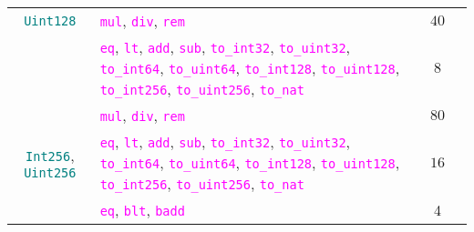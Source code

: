 \documentclass[9pt]{article}
\begin{document}
\begin{table}[!hbt]
\begin{tabular}{|c|p{4.1cm}|c|p{5cm}|}
{		\texttt{\textcolor{teal}{Uint128}}} &
		\texttt{\textcolor{magenta}{mul}},
		 \texttt{\textcolor{magenta}{div}}, \texttt{\textcolor{magenta}{rem}} &
		 $ 40 $  & \\ \cline{2-4}
		 & \texttt{\textcolor{magenta}{eq}}, \texttt{\textcolor{magenta}{lt}},
		 \texttt{\textcolor{magenta}{add}}, \texttt{\textcolor{magenta}{sub}},
		 \texttt{\textcolor{magenta}{to\_int32}},
		 \texttt{\textcolor{magenta}{to\_uint32}},
		 \texttt{\textcolor{magenta}{to\_int64}},
		 \texttt{\textcolor{magenta}{to\_uint64}},
		 \texttt{\textcolor{magenta}{to\_int128}},
		 \texttt{\textcolor{magenta}{to\_uint128}},
		 \texttt{\textcolor{magenta}{to\_int256}},
		 \texttt{\textcolor{magenta}{to\_uint256}},
		 \texttt{\textcolor{magenta}{to\_nat}}
		 & $8$  & \\ \hline \hline
		\multirow{4}{*}{\texttt{\textcolor{teal}{Int256}},
		\texttt{\textcolor{teal}{Uint256}}} &
		\texttt{\textcolor{magenta}{mul}},
		 \texttt{\textcolor{magenta}{div}}, \texttt{\textcolor{magenta}{rem}} &
		 $ 80 $  & \\ \cline{2-4}
		 & \texttt{\textcolor{magenta}{eq}}, \texttt{\textcolor{magenta}{lt}},
		 \texttt{\textcolor{magenta}{add}}, \texttt{\textcolor{magenta}{sub}},
		 \texttt{\textcolor{magenta}{to\_int32}},
		 \texttt{\textcolor{magenta}{to\_uint32}},
		 \texttt{\textcolor{magenta}{to\_int64}},
		 \texttt{\textcolor{magenta}{to\_uint64}},
		 \texttt{\textcolor{magenta}{to\_int128}},
		 \texttt{\textcolor{magenta}{to\_uint128}},
		 \texttt{\textcolor{magenta}{to\_int256}},
		 \texttt{\textcolor{magenta}{to\_uint256}},
		 \texttt{\textcolor{magenta}{to\_nat}}
		 & $ 16 $  & \\ \hline \hline
		\texttt{\textcolor{teal}{BNum}} &
		\texttt{\textcolor{magenta}{eq}}, \texttt{\textcolor{magenta}{blt}},
		\texttt{\textcolor{magenta}{badd}} & 4  & \\ \hline 
	\end{tabular}
\end{table}




\end{document}
